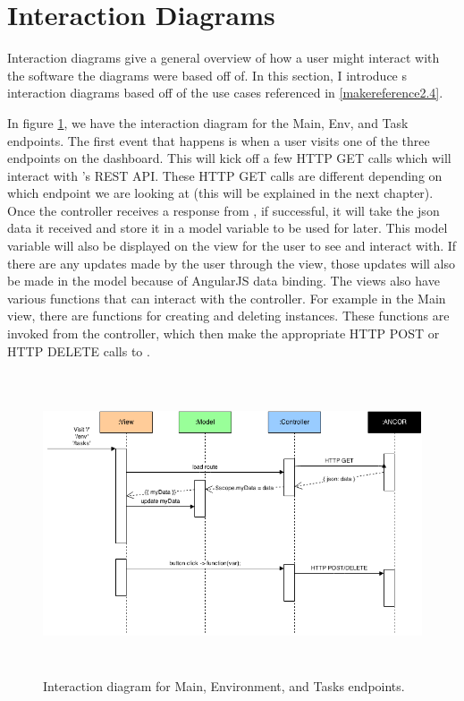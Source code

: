 \section{Interaction Diagrams}
\label{makereference2.5}

Interaction diagrams give a general overview of how a user might interact with the software the diagrams were based off of. In this section, I introduce \projectName{}s interaction diagrams based off of the use cases referenced in \ref{makereference2.4}.

In figure \ref{mainInterDiagram}, we have the interaction diagram for the Main, Env, and Task endpoints. The first event that happens is when a user visits one of the three endpoints on the dashboard. This will kick off a few HTTP GET calls which will interact with \ancor{}'s REST API. These HTTP GET calls are different depending on which endpoint we are looking at (this will be explained in the next chapter). Once the controller receives a response from \ancor{}, if successful, it will take the json data it received and store it in a model variable to be used for later. This model variable will also be displayed on the view for the user to see and interact with. If there are any updates made by the user through the view, those updates will also be made in the model because of AngularJS data binding. The views also have various functions that can interact with the controller. For example in the Main view, there are functions for creating and deleting instances. These functions are invoked from the controller, which then make the appropriate HTTP POST or HTTP DELETE calls to \ancor{}.

\begin{figure}[htb]%

    \includegraphics[height=3.5in]{figures/MainCtrl-Interaction-Diagram.png}

    \caption[Main, Env, and Task Interaction Diagram
    ]{Interaction diagram for Main, Environment, and Tasks endpoints.}

    \label{mainInterDiagram}
\end{figure}

